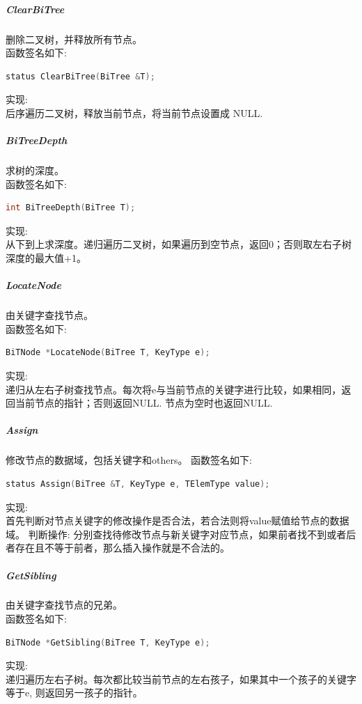 \documentclass[supercite]{Experimental_Report}
\theoremstyle{definition}
\begin{document}
\subparagraph{ClearBiTree}
\noindent
删除二叉树，并释放所有节点。\\
函数签名如下:
\begin{lstlisting}[language=C++, frame=single]
status ClearBiTree(BiTree &T);
\end{lstlisting}
实现: \\
后序遍历二叉树，释放当前节点，将当前节点设置成 NULL. \\

\subparagraph{BiTreeDepth}
\noindent
求树的深度。 \\
函数签名如下:
\begin{lstlisting}[language=C++, frame=single]
int BiTreeDepth(BiTree T);
\end{lstlisting}
实现: \\
从下到上求深度。递归遍历二叉树，如果遍历到空节点，返回0；否则取左右子树深度的最大值+1。 \\

\subparagraph{LocateNode}
\noindent
由关键字查找节点。 \\
函数签名如下:
\begin{lstlisting}[language=C++, frame=single]
BiTNode *LocateNode(BiTree T, KeyType e);
\end{lstlisting}
实现: \\
递归从左右子树查找节点。每次将e与当前节点的关键字进行比较，如果相同，返回当前节点的指针；否则返回NULL. 节点为空时也返回NULL. \\

\subparagraph{Assign}
\noindent
修改节点的数据域，包括关键字和others。
函数签名如下:
\begin{lstlisting}[language=C++, frame=single]
status Assign(BiTree &T, KeyType e, TElemType value);
\end{lstlisting}
实现: \\
首先判断对节点关键字的修改操作是否合法，若合法则将value赋值给节点的数据域。
判断操作: 分别查找待修改节点与新关键字对应节点，如果前者找不到或者后者存在且不等于前者，那么插入操作就是不合法的。

\subparagraph{GetSibling}
\noindent
由关键字查找节点的兄弟。 \\
函数签名如下:
\begin{lstlisting}[language=C++, frame=single]
BiTNode *GetSibling(BiTree T, KeyType e);
\end{lstlisting}
实现: \\
递归遍历左右子树。每次都比较当前节点的左右孩子，如果其中一个孩子的关键字等于e, 则返回另一孩子的指针。\\
\end{document}
